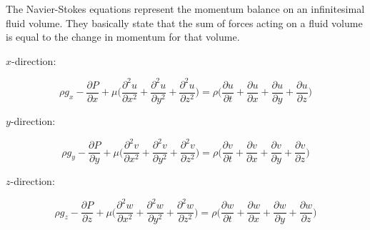 The Navier-Stokes equations represent the momentum balance on an infinitesimal fluid volume. They basically state that the sum of forces acting on a fluid volume is equal to the change in momentum for that volume.

$x$-direction:

\begin{equation}
\rho g_x - \frac{\partial P}{\partial x} + \mu \Big( \frac{\partial^2 u}{\partial x^2} + \frac{\partial^2 u}{\partial y^2} + \frac{\partial^2 u}{\partial z^2}\Big) = \rho \Big( \frac{\partial u}{\partial t} + \frac{\partial u}{\partial x} + \frac{\partial u}{\partial y} + \frac{\partial u}{\partial z} \Big)
\end{equation}

$y$-direction:

\begin{equation}
\rho g_y - \frac{\partial P}{\partial y} + \mu \Big( \frac{\partial^2 v}{\partial x^2} + \frac{\partial^2 v}{\partial y^2} + \frac{\partial^2 v}{\partial z^2}\Big) = \rho \Big( \frac{\partial v}{\partial t} + \frac{\partial v}{\partial x} + \frac{\partial v}{\partial y} + \frac{\partial v}{\partial z} \Big)
\end{equation}

$z$-direction:

\begin{equation}
\rho g_z - \frac{\partial P}{\partial z} + \mu \Big( \frac{\partial^2 w}{\partial x^2} + \frac{\partial^2 w}{\partial y^2} + \frac{\partial^2 w}{\partial z^2}\Big) = \rho \Big( \frac{\partial w}{\partial t} + \frac{\partial w}{\partial x} + \frac{\partial w}{\partial y} + \frac{\partial w}{\partial z} \Big)
\end{equation}
